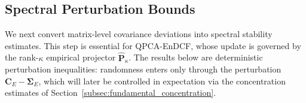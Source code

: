 \documentclass[11pt,a4paper]{article}
\begin{document}


\subsection{Spectral Perturbation Bounds}
\label{subsec:spectral_perturbation}

We next convert matrix-level covariance deviations into spectral stability estimates. This step is essential for QPCA-EnDCF, whose update is governed by the rank-$\kappa$ empirical projector $\hat{\mathbf{P}}_\kappa$. The results below are deterministic perturbation inequalities: randomness enters only through the perturbation $\mathbf{C}_E-\boldsymbol{\Sigma}_E$, which will later be controlled in expectation via the concentration estimates of Section~\ref{subsec:fundamental_concentration}.
\end{document}
